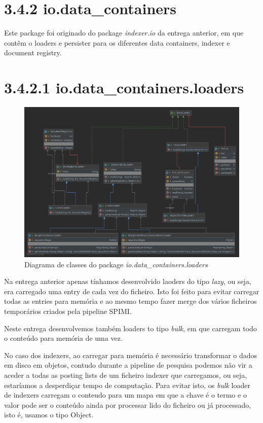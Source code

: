 \documentclass[12pt]{article}
\begin{document}
\section*{3.4.2 io.data\_containers}

Este package foi originado do package {\it indexer.io} da entrega anterior,
em que contêm o loaders e persister para os diferentes data
containers, indexer e document registry.

\section*{3.4.2.1 io.data\_containers.loaders}
\begin{figure}[H]
  \center
   \includegraphics[width=\linewidth]{packages_io_data_containers_loaders.png}
  \caption{Diagrama de classes do package \it
    io.data\_containers.loaders}
\end{figure}

Na entrega anterior apenas tínhamos desenvolvido laoders do tipo {\it
lazy}, ou seja, era carregado uma entry de cada vez do ficheiro. Isto
foi feito para evitar carregar todas as entries para memória e ao
mesmo tempo fazer merge dos vários ficheiros temporários criados pela
pipeline SPIMI.

Neste entrega desenvolvemos também loaders to tipo {\it bulk}, em que
carregam todo o conteúdo para memória de uma vez.

No caso dos indexers, ao carregar para memória é necessário
transformar o dados em disco em objetos, contudo durante a pipeline
de pesquisa podemos não vir a aceder a todas as posting lists de um
ficheiro indexer que carregamos, ou seja, estaríamos a desperdiçar
tempo de computação.
Para evitar isto, os {\it bulk} loader de indexers carregam o
conteudo para um mapa em que a chave é o termo e o valor pode ser o
conteúdo ainda por processar lido do ficheiro ou já processado, isto
é, usamos o tipo Object.
\end{document}
